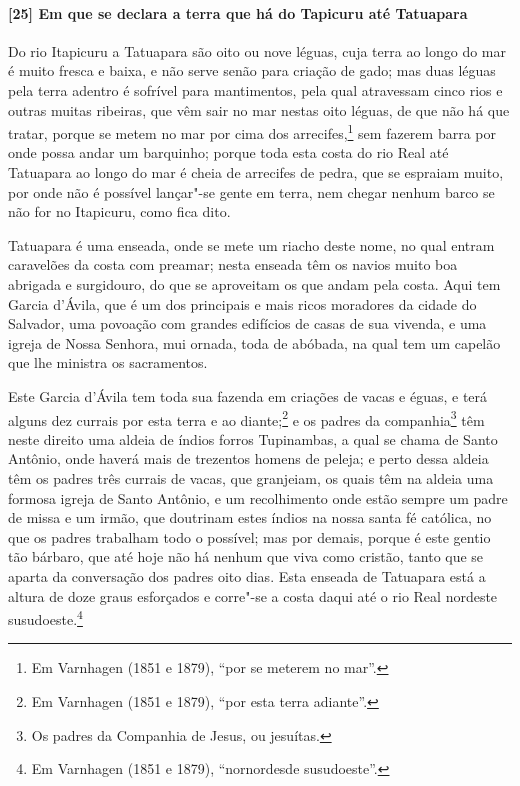 \begin{linenumbers}
\paragraph{[25] Em que se declara a terra que há do Tapicuru até Tatuapara} \quad
Do rio Itapicuru a Tatuapara são oito ou nove léguas, cuja terra ao longo do mar é muito
fresca e baixa, e não serve senão para criação de gado; mas duas léguas pela terra adentro
é sofrível para mantimentos, pela qual atravessam cinco rios e outras muitas ribeiras, que
vêm sair no mar nestas oito léguas, de que não há que tratar, porque se metem no mar por
cima dos arrecifes,\footnote{ Em Varnhagen (1851 e 1879), ``por se meterem no mar''.} sem
fazerem barra por onde possa andar um barquinho; porque toda esta costa do rio Real até
Tatuapara ao longo do mar é cheia de arrecifes de pedra, que se espraiam muito, por onde
não é possível lançar"-se gente em terra, nem chegar nenhum barco se não for no Itapicuru,
como fica dito.

Tatuapara é uma enseada, onde se mete um riacho deste nome, no qual entram caravelões da
costa com preamar; nesta enseada têm os navios muito boa abrigada e surgidouro, do que se
aproveitam os que andam pela costa. Aqui tem Garcia d'Ávila, que é um dos principais e
mais ricos moradores da cidade do Salvador, uma povoação com grandes edifícios de casas de
sua vivenda, e uma igreja de Nossa Senhora, mui ornada, toda de abóbada, na qual tem um
capelão que lhe ministra os sacramentos.

Este Garcia d'Ávila tem toda sua fazenda em criações de vacas e éguas, e terá alguns dez
currais por esta terra e ao diante;\footnote{ Em Varnhagen (1851 e 1879), ``por esta terra
adiante''.} e os padres da companhia\footnote{ Os padres da Companhia de Jesus, ou
jesuítas.} têm neste direito uma aldeia de índios forros Tupinambas, a qual se chama de
Santo Antônio, onde haverá mais de trezentos homens de peleja; e perto dessa aldeia têm os
padres três currais de vacas, que granjeiam, os quais têm na aldeia uma formosa igreja de
Santo Antônio, e um recolhimento onde estão sempre um padre de missa e um irmão, que
doutrinam estes índios na nossa santa fé católica, no que os padres trabalham todo o
possível; mas por demais, porque é este gentio tão bárbaro, que até hoje não há nenhum que
viva como cristão, tanto que se aparta da conversação dos padres oito dias. Esta enseada
de Tatuapara está a altura de doze graus esforçados e corre"-se a costa daqui até o rio
Real nordeste susudoeste.\footnote{ Em Varnhagen (1851 e 1879), ``nornordesde
susudoeste''.}


\end{linenumbers}
